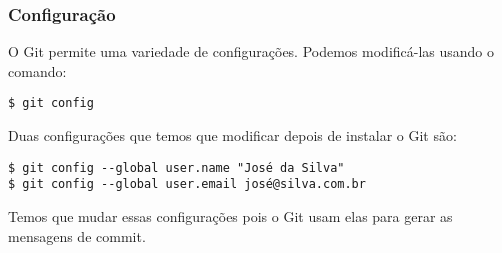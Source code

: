 \documentclass[brazil]{beamer}
\begin{document}
\begin{frame}[fragile]
  \frametitle{Configuração}
  O Git permite uma variedade de configurações. Podemos modificá-las usando o comando:
  \begin{block}{}
    \verb#$ git config#
  \end{block}
  \pause
  Duas configurações que temos que modificar depois de instalar o Git são:
  \begin{block}{}
      \verb#$ git config --global user.name "José da Silva"# \\
      \verb#$ git config --global user.email josé@silva.com.br#
  \end{block}
  Temos que mudar essas configurações pois o Git usam elas para gerar as mensagens de commit.
\end{frame}
\end{document}
